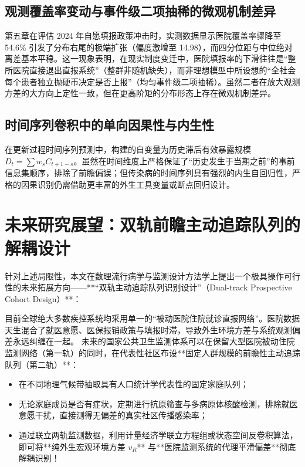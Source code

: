 \subsection{观测覆盖率变动与事件级二项抽稀的微观机制差异}
第五章在评估 2024 年自愿填报政策冲击时，实测数据显示医院覆盖率骤降至 54.6\% 引发了分布右尾的极端扩张（偏度激增至 14.98），而四分位距与中位绝对离差基本平稳。这一现象表明，在现实制度变迁中，医院填报率的下滑往往是“整所医院直接退出直报系统”（整群非随机缺失），而非理想模型中所设想的“全社会每个患者独立抛硬币决定是否上报”（均匀事件级二项抽稀）。虽然二者在放大观测方差的大方向上定性一致，但在更高阶矩的分布形态上存在微观机制差异。

\subsection{时间序列卷积中的单向因果性与内生性}
在更新过程时间序列预测中，构建的自变量为历史滞后有效暴露规模 $D_t = \sum w_s C_{t+1-s}$。虽然在时间维度上严格保证了“历史发生于当期之前”的事前信息集顺序，排除了前瞻偏误；但传染病的时间序列具有强烈的内生自回归性，严格的因果识别仍需借助更丰富的外生工具变量或断点回归设计。

\section{未来研究展望：双轨前瞻主动追踪队列的解耦设计}\label{sec:future_work}

针对上述局限性，本文在数理流行病学与监测设计方法学上提出一个极具操作可行性的未来拓展方向——**“双轨主动追踪队列识别设计”（Dual-track Prospective Cohort Design）**：

目前全球绝大多数疾控系统均采用单一的“被动医院住院就诊直报网络”。医院数据天生混合了就医意愿、医保报销政策与填报时滞，导致外生环境方差与系统观测偏差永远纠缠在一起。
未来的国家公共卫生监测体系可以在保留大型医院被动住院监测网络（第一轨）的同时，在代表性社区布设**固定人群规模的前瞻性主动追踪队列（第二轨）**：
\begin{itemize}
    \item 在不同地理气候带抽取具有人口统计学代表性的固定家庭队列；
    \item 无论家庭成员是否有症状，定期进行抗原筛查与多病原体核酸检测，排除就医意愿干扰，直接测得无偏差的真实社区传播感染率；
    \item 通过联立两轨监测数据，利用计量经济学联立方程组或状态空间反卷积算法，即可将**纯外生宏观环境方差 $v_R$** 与**医院监测系统的代理平滑偏差**彻底解耦识别！
\end{itemize}

